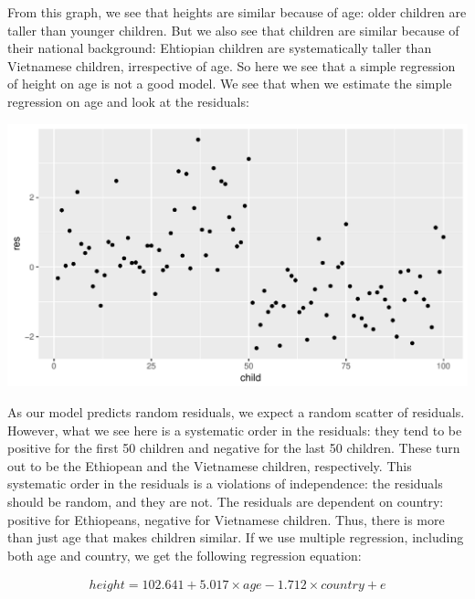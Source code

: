 \documentclass[]{report}\usepackage[]{graphicx}\usepackage[]{color}
\makeatletter
\def\maxwidth{ %
  \ifdim\Gin@nat@width>\linewidth
    \linewidth
  \else
    \Gin@nat@width
  \fi
}
\newenvironment{knitrout}{}{} %
\makeatother
\begin{document}
From this graph, we see that heights are similar because of age: older children are taller than younger children. But we also see that children are similar because of their national background: Ehtiopian children are systematically taller than Vietnamese children, irrespective of age. So here we see that a simple regression of height on age is not a good model. We see that when we estimate the simple regression on age and look at the residuals:

\begin{knitrout}
\color{fgcolor}

{\centering \includegraphics[width=\maxwidth]{figure/fig141-1} 

}



\end{knitrout}

As our model predicts random residuals, we expect a random scatter of residuals. However, what we see here is a systematic order in the residuals: they tend to be positive for the first 50 children and negative for the last 50 children. These turn out to be the Ethiopean and the Vietnamese children, respectively. This systematic order in the residuals is a violations of independence: the residuals should be random, and they are not. The residuals are dependent on country: positive for Ethiopeans, negative for Vietnamese children. Thus, there is more than just age that makes children similar. 
If we use multiple regression, including both age and country, we get the following regression equation:



\begin{eqnarray}
height = 102.641 + 5.017 \times age - 1.712 \times country + e
\end{eqnarray}
\end{document}
